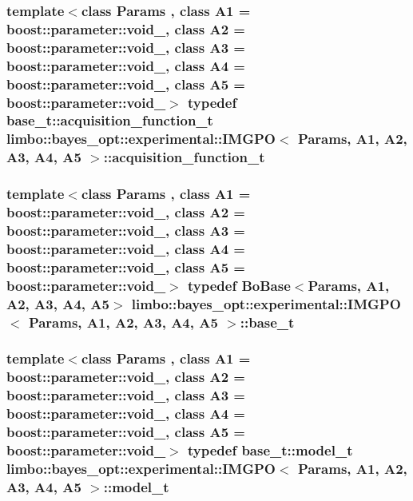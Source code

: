 \subsubsection[{acquisition\+\_\+function\+\_\+t}]{\setlength{\rightskip}{0pt plus 5cm}template$<$class Params , class A1  = boost\+::parameter\+::void\+\_\+, class A2  = boost\+::parameter\+::void\+\_\+, class A3  = boost\+::parameter\+::void\+\_\+, class A4  = boost\+::parameter\+::void\+\_\+, class A5  = boost\+::parameter\+::void\+\_\+$>$ typedef {\bf base\+\_\+t\+::acquisition\+\_\+function\+\_\+t} {\bf limbo\+::bayes\+\_\+opt\+::experimental\+::\+I\+M\+G\+P\+O}$<$ Params, A1, A2, A3, A4, A5 $>$\+::{\bf acquisition\+\_\+function\+\_\+t}}\label{classlimbo_1_1bayes__opt_1_1experimental_1_1_i_m_g_p_o_af7f26bfe0e3119ce147088e9e8fbfc17}
\hypertarget{classlimbo_1_1bayes__opt_1_1experimental_1_1_i_m_g_p_o_a08e12049587eed6be7bc86f05da043f0}{}
\subsubsection[{base\+\_\+t}]{\setlength{\rightskip}{0pt plus 5cm}template$<$class Params , class A1  = boost\+::parameter\+::void\+\_\+, class A2  = boost\+::parameter\+::void\+\_\+, class A3  = boost\+::parameter\+::void\+\_\+, class A4  = boost\+::parameter\+::void\+\_\+, class A5  = boost\+::parameter\+::void\+\_\+$>$ typedef {\bf Bo\+Base}$<$Params, A1, A2, A3, A4, A5$>$ {\bf limbo\+::bayes\+\_\+opt\+::experimental\+::\+I\+M\+G\+P\+O}$<$ Params, A1, A2, A3, A4, A5 $>$\+::{\bf base\+\_\+t}}\label{classlimbo_1_1bayes__opt_1_1experimental_1_1_i_m_g_p_o_a08e12049587eed6be7bc86f05da043f0}
\hypertarget{classlimbo_1_1bayes__opt_1_1experimental_1_1_i_m_g_p_o_a2a2958dccaec1f7f1b21a2d4c85cf1fc}{}
\subsubsection[{model\+\_\+t}]{\setlength{\rightskip}{0pt plus 5cm}template$<$class Params , class A1  = boost\+::parameter\+::void\+\_\+, class A2  = boost\+::parameter\+::void\+\_\+, class A3  = boost\+::parameter\+::void\+\_\+, class A4  = boost\+::parameter\+::void\+\_\+, class A5  = boost\+::parameter\+::void\+\_\+$>$ typedef {\bf base\+\_\+t\+::model\+\_\+t} {\bf limbo\+::bayes\+\_\+opt\+::experimental\+::\+I\+M\+G\+P\+O}$<$ Params, A1, A2, A3, A4, A5 $>$\+::{\bf model\+\_\+t}}\label{classlimbo_1_1bayes__opt_1_1experimental_1_1_i_m_g_p_o_a2a2958dccaec1f7f1b21a2d4c85cf1fc}


